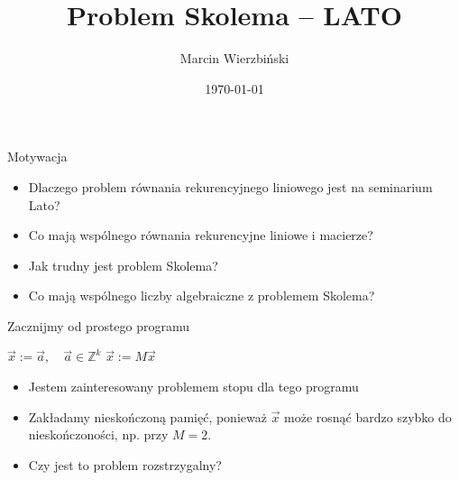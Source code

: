 \documentclass[handout]{beamer}
\title{Problem Skolema -- LATO}
\author{Marcin Wierzbiński}
\institute{MIMUW}
\date{\today}
\def\Z{\mathbb Z}
\theoremstyle{definition}
\theoremstyle{named}
\begin{document}
\frame{\titlepage}

\begin{frame}{Motywacja}
\begin{itemize}
    \item Dlaczego problem równania rekurencyjnego liniowego jest na seminarium Lato? 
    \item Co mają wspólnego równania rekurencyjne liniowe i macierze?
    \item Jak trudny jest problem Skolema?  
    \item Co mają wspólnego liczby algebraiczne z problemem Skolema? 
\end{itemize}
\end{frame}

\begin{frame}{Zacznijmy od prostego programu}
    \begin{algorithm}[H] 
        \begin{algorithmic}[l]
        \State $\vec{x} := \vec{a}, \quad \vec{a} \in \Z^{k}$  
          \State $\vec{x} := M \vec{x}$ \algorithmiccomment{$M \in \Z^{k \times k}$}
          
        \EndWhile
        \end{algorithmic}
    \end{algorithm}
    
    \begin{itemize}
    \pause 
    \item Jestem zainteresowany problemem stopu dla tego programu
    \pause 
    \item  Zakładamy nieskończoną pamięć, ponieważ $\vec{x}$ może rosnąć bardzo szybko do nieskończoności, np. przy $M=2$.
    \pause
    
    \item  Czy jest to problem rozstrzygalny?
    \end{itemize}

\end{frame}
\end{document}
